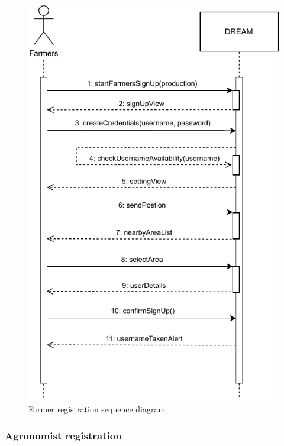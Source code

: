 \documentclass[../../main.tex]{subfiles}
\begin{document}
      \begin{figure}[H]
        \centering
        \includegraphics[width=13cm]{RASD/image/Sequence_Diagram_Farmers.pdf}
        \caption{Farmer registration sequence diagram}
      \end{figure}


      \subsubsection{Agronomist registration}
\end{document}

